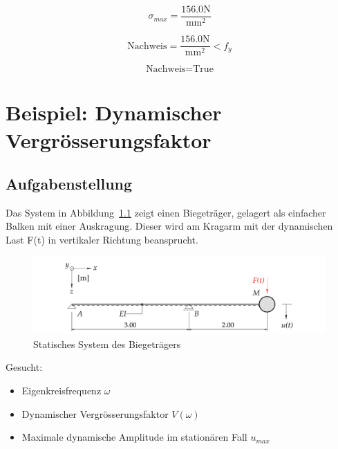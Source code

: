\documentclass[
  letterpaper,
  DIV=11]{scrreprt}
\providecommand{\tightlist}{%
  \setlength{\itemsep}{0pt}\setlength{\parskip}{0pt}}\usepackage{longtable,booktabs,array}
\begin{document}
\begin{equation}\sigma_{max} = \frac{156.0 \text{N}}{\text{mm}^{2}}\end{equation}

\begin{equation}\text{Nachweis} = \frac{156.0 \text{N}}{\text{mm}^{2}} < f_{y}\end{equation}

\begin{equation}\text{Nachweis} = \text{True}\end{equation}

\hypertarget{beispiel-dynamischer-vergruxf6sserungsfaktor}{%
\chapter{Beispiel: Dynamischer
Vergrösserungsfaktor}\label{beispiel-dynamischer-vergruxf6sserungsfaktor}}

\hypertarget{aufgabenstellung-5}{%
\section{Aufgabenstellung}\label{aufgabenstellung-5}}

Das System in Abbildung~\ref{fig-ems_dyn_verg_system_biegetrager} zeigt
einen Biegeträger, gelagert als einfacher Balken mit einer Auskragung.
Dieser wird am Kragarm mit der dynamischen Last F(t) in vertikaler
Richtung beansprucht.

\begin{figure}[H]

{\centering \includegraphics{index_files/mediabag/bilder/aufgabe_ems_dynamischer_vergroesserungsfaktor.pdf}

}

\caption{\label{fig-ems_dyn_verg_system_biegetrager}Statisches System
des Biegeträgers}

\end{figure}

Gesucht:

\begin{itemize}
\tightlist
\item
  Eigenkreisfrequenz \(\omega\)
\item
  Dynamischer Vergrösserungsfaktor \(V(\omega)\)
\item
  Maximale dynamische Amplitude im stationären Fall \(u_{max}\)
\end{itemize}
\end{document}
